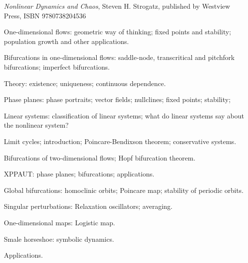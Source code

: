 \documentclass{osucourse}
\begin{document}
\CatalogDescription
\PrerequisitesAndExclusions

\begin{Text}
\emph{Nonlinear Dynamics and Chaos}, Steven H. Strogatz, published by
Westview Press, ISBN 9780738204536
\end{Text}

\begin{TopicsList}
\item
  One-dimensional flows: geometric way of thinking; fixed points and
  stability; population growth and other applications.
\item
  Bifurcations in one-dimensional flows: saddle-node, transcritical and
  pitchfork bifurcations; imperfect bifurcations.
\item
  Theory: existence; uniqueness; continuous dependence.
\item
  Phase planes: phase portraits; vector fields; nullclines; fixed
  points; stability;
\item
  Linear systems: classification of linear systems; what do linear
  systems say about the nonlinear system?
\item
  Limit cycles; introduction; Poincare-Bendixson theorem; conservative
  systems.
\item
  Bifurcations of two-dimensional flows; Hopf bifurcation theorem.
\item
  XPPAUT: phase planes; bifurcations; applications.
\item
  Global bifurcations: homoclinic orbits; Poincare map; stability of
  periodic orbits.
\item
  Singular perturbations: Relaxation oscillators; averaging.
\item
  One-dimensional maps: Logistic map.
\item
  Smale horseshoe: symbolic dynamics.
\item
  Applications.
\end{TopicsList}

\begin{SuggestedSchedule}
\end{SuggestedSchedule}
\end{document}

